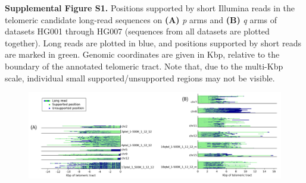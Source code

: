 \documentclass{article}
\begin{document}
\begin{samepage}

\noindent \textbf{Supplemental Figure S1.}
Positions supported by short Illumina reads in the telomeric candidate long-read sequences on \textbf{(A)} \textit{p} arms and \textbf{(B)} \textit{q} arms of datasets HG001 through HG007 (sequences from all datasets are plotted together).
Long reads are plotted in blue, and positions supported by short reads are marked in green.
Genomic coordinates are given in Kbp, relative to the boundary of the annotated telomeric tract.
Note that, due to the multi-Kbp scale, individual small supported/unsupported regions may not be visible.

\begin{figure}[h!] \centering
\includegraphics[width=\textwidth,keepaspectratio]{Figure_S1-nolegend.pdf}
\end{figure}

\end{samepage}
\end{document}
